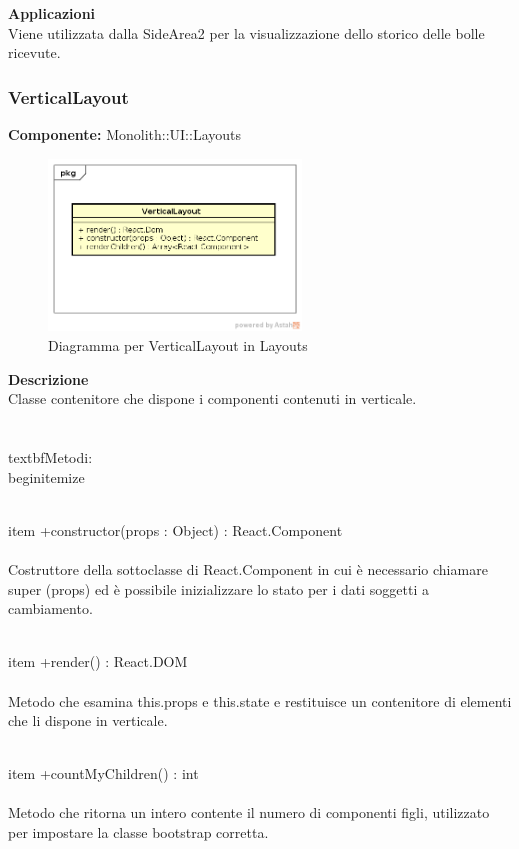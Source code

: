 \textbf{Applicazioni}\\
Viene utilizzata dalla SideArea2 per la visualizzazione dello storico delle bolle ricevute. 


\clearpage

\subsubsection{VerticalLayout}
\textbf{Componente:}  Monolith::UI::Layouts\\
   \FloatBarrier
   \begin{figure}[ht]
   \centering
   \includegraphics[width=0.6\textwidth]{img/single-VerticalLayout}
   \caption{{Diagramma per VerticalLayout in Layouts}}
\end{figure}
\FloatBarrier
\textbf{Descrizione}\\
Classe contenitore che dispone i componenti contenuti in verticale. \\\\
\\textbf{Metodi:}
\\begin{itemize}

\\item +constructor(props : Object) : React.Component 
\\\\
Costruttore della sottoclasse di React.Component in cui è necessario chiamare super (props) ed è possibile inizializzare lo stato per i dati soggetti a cambiamento.

\\item +render() : React.DOM 
\\\\
Metodo che esamina this.props e this.state e restituisce un contenitore di elementi che li dispone in verticale.

\\item +countMyChildren() : int
\\\\
Metodo che ritorna un intero contente il numero di componenti figli, utilizzato per impostare la classe bootstrap corretta.


